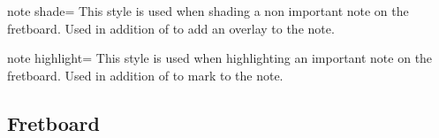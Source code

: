 \documentclass[a4paper]{article}
\begin{document}
\begin{docKey}[tikz][]{note shade}{=}{}
  This style is used when shading a non important note on the
  fretboard. Used in addition of  to add an overlay to
  the note.
\end{docKey}

\begin{docKey}[tikz][]{note highlight}{=}{}
  This style is used when highlighting an important note on the
  fretboard. Used in addition of  to mark to
  the note.
\end{docKey}


\subsection{Fretboard}
\end{document}

